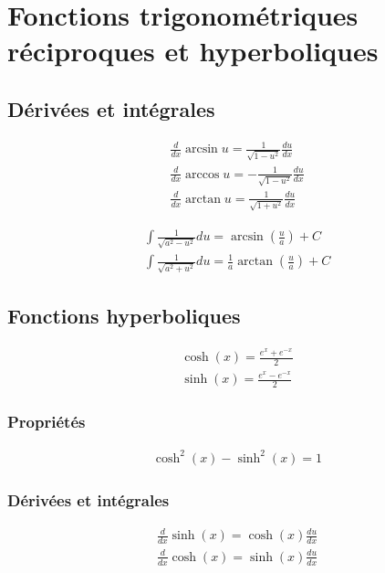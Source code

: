 \chapter{Fonctions trigonométriques réciproques et hyperboliques}
\section{Dérivées et intégrales}
\begin{eqnarray}
	\frac{d}{dx}\arcsin u = \frac{1}{\sqrt{1-u^2}}\frac{du}{dx}\\
	\frac{d}{dx}\arccos u = -\frac{1}{\sqrt{1-u^2}}\frac{du}{dx}\\
	\frac{d}{dx}\arctan u = \frac{1}{\sqrt{1+u^2}}\frac{du}{dx}
\end{eqnarray}

\begin{eqnarray}
	\int\frac{1}{\sqrt{a^2-u^2}}du=\arcsin{\left(\frac{u}{a}\right)}+C\\
	\int\frac{1}{\sqrt{a^2+u^2}}du=\frac{1}{a}\arctan{\left(\frac{u}{a}\right)}+C
\end{eqnarray}

\section{Fonctions hyperboliques}
\begin{eqnarray}
	\cosh{(x)}=\frac{e^x+e^{-x}}{2}\\
	\sinh{(x)}=\frac{e^x-e^{-x}}{2}
\end{eqnarray}

\subsection{Propriétés}
\begin{eqnarray}
	\cosh^2{(x)}-\sinh^2{(x)}=1
\end{eqnarray}
\subsection{Dérivées et intégrales}
\begin{eqnarray}
	\frac{d}{dx}\sinh{(x)}=\cosh{(x)}\frac{du}{dx}\\
	\frac{d}{dx}\cosh{(x)}=\sinh{(x)}\frac{du}{dx}
\end{eqnarray}

